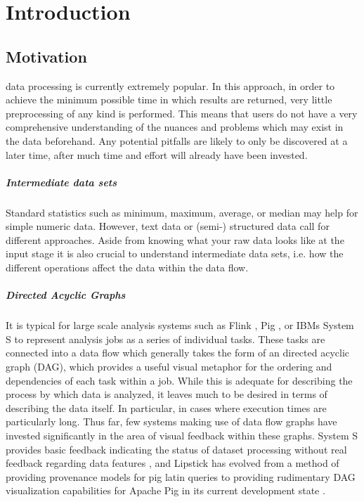 \chapter{Introduction}
\label{sec:Introduction}



\section{Motivation}
 data processing is currently extremely popular. In this approach, in order to achieve the minimum possible time in which results are returned, very little preprocessing of any kind is performed. This means that users do not have a very comprehensive understanding of the nuances and problems which may exist in the data beforehand. Any potential pitfalls are likely to only be discovered at a later time, after much time and effort will already have been invested.

\paragraph{Intermediate data sets}
Standard statistics such as minimum, maximum, average, or median may help for simple numeric data. However, text data or (semi-) structured data call for different approaches. Aside from knowing what your raw data looks like at the input stage it is also crucial to understand intermediate data sets, i.e. how the different operations affect the data within the data flow.

\paragraph{Directed Acyclic Graphs}
It is typical for large scale analysis systems such as Flink \citep{Battre2010}, Pig \citep{Amsterdamer2011}, or IBMs System S \citep{Gedik2008} to represent analysis jobs as a series of individual tasks. These tasks are connected into a data flow which generally takes the form of an directed acyclic graph (DAG), which provides a useful visual metaphor for the ordering and dependencies of each task within a job. While this is adequate for describing the process by which data is analyzed, it leaves much to be desired in terms of describing the data itself. In particular, in cases where execution times are particularly long. Thus far, few systems making use of data flow graphs have invested significantly in the area of visual feedback within these graphs. System S provides basic feedback indicating the status of dataset processing without real feedback regarding data features \citep{Pauw2010}, and Lipstick has evolved from a method of providing provenance models for pig latin queries to providing rudimentary DAG visualization capabilities for Apache Pig in its current development state \citep{Amsterdamer2011}.

